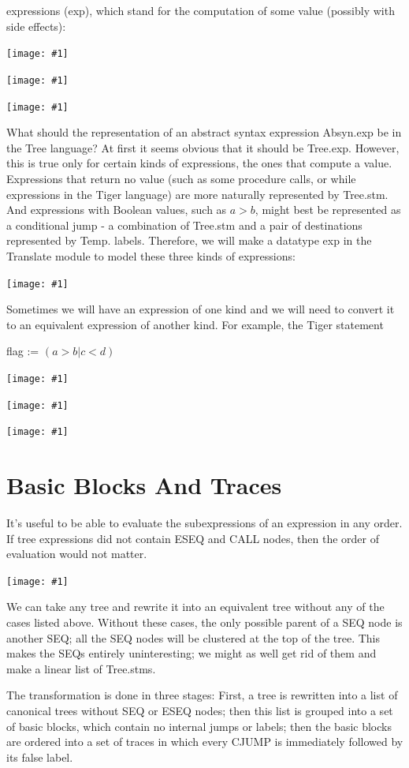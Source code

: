 \documentclass[8pt, a4paper, oneside, twocolumn]{extarticle}
\newcommand{\ph}[1]{
    \texttt{[image: \#1]}
}
\begin{document}
expressions (exp), which stand for the computation of some value (possibly
with side effects):

\ph{ir3}

\ph{ir4}

\ph{ir5}

What should the representation of an abstract syntax expression Absyn.exp
be in the Tree language? At first it seems obvious that it should be Tree.exp.
However, this is true only for certain kinds of expressions, the ones that 
compute a value. Expressions that return no value (such as some procedure calls,
or while expressions in the Tiger language) are more naturally represented
by Tree.stm. And expressions with Boolean values, such as $a > b$, might
best be represented as a conditional jump - a combination of Tree.stm and
a pair of destinations represented by Temp. labels.
Therefore, we will make a datatype exp in the Translate module to
model these three kinds of expressions:

\ph{ir6}

Sometimes we will have an expression of one kind and we will need to
convert it to an equivalent expression of another kind. For example, the Tiger
statement

flag := $(a>b \vert c<d)$

\ph{ir7}

\ph{ir8}

\ph{ir9}

\section{Basic Blocks And Traces}
It's useful to be able to evaluate the subexpressions of an 
expression in any order. If tree expressions did not contain ESEQ and CALL nodes,
then the order of evaluation would not matter.

\ph{81}

We can take any tree and rewrite it into an equivalent tree without any of
the cases listed above. Without these cases, the only possible parent of a SEQ
node is another SEQ; all the SEQ nodes will be clustered at the top of the tree.
This makes the SEQs entirely uninteresting; we might as well get rid of them
and make a linear list of Tree.stms.

The transformation is done in three stages: First, a tree is rewritten into a
list of canonical trees without SEQ or ESEQ nodes; then this list is grouped
into a set of basic blocks, which contain no internal jumps or labels; then
the basic blocks are ordered into a set of traces in which every CJUMP is
immediately followed by its false label.
\end{document}
